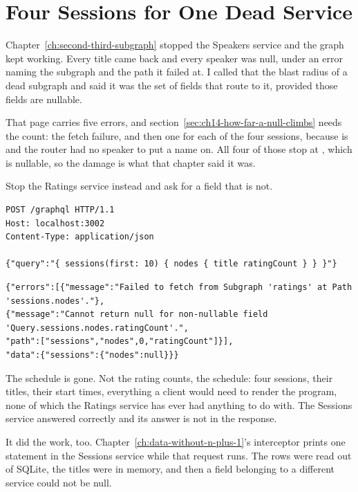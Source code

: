 \section{Four Sessions for One Dead Service}
\label{sec:ch14-four-sessions-for-one-dead-service}

%
Chapter~\ref{ch:second-third-subgraph} stopped the Speakers service and the
graph kept working. Every title came back and every speaker was null, under an
error naming the subgraph and the path it failed at. I called that the blast
radius of a dead subgraph and said it was the set of fields that route to it,
provided those fields are nullable.

%
That page carries five errors, and
section~\ref{sec:ch14-how-far-a-null-climbs} needs the count: the fetch
failure, and then one for each of the four sessions, because
 is  and the router had no speaker to put a
name on. All four of those stop at , which is nullable, so the
damage is what that chapter said it was.

Stop the Ratings service instead and ask for a field that is not.

\begin{verbatim}
POST /graphql HTTP/1.1
Host: localhost:3002
Content-Type: application/json

{"query":"{ sessions(first: 10) { nodes { title ratingCount } } }"}
\end{verbatim}

\begin{verbatim}
{"errors":[{"message":"Failed to fetch from Subgraph 'ratings' at Path 'sessions.nodes'."},
{"message":"Cannot return null for non-nullable field 'Query.sessions.nodes.ratingCount'.",
"path":["sessions","nodes",0,"ratingCount"]}],
"data":{"sessions":{"nodes":null}}}
\end{verbatim}

%
The schedule is gone. Not the rating counts, the schedule: four sessions, their
titles, their start times, everything a client would need to render the
program, none of which the Ratings service has ever had anything to do with.
The Sessions service answered correctly and its answer is not in the response.

%
It did the work, too. Chapter~\ref{ch:data-without-n-plus-1}'s interceptor
prints one statement in the Sessions service while that request runs. The rows
were read out of SQLite, the titles were in memory, and then a field belonging
to a different service could not be null.

